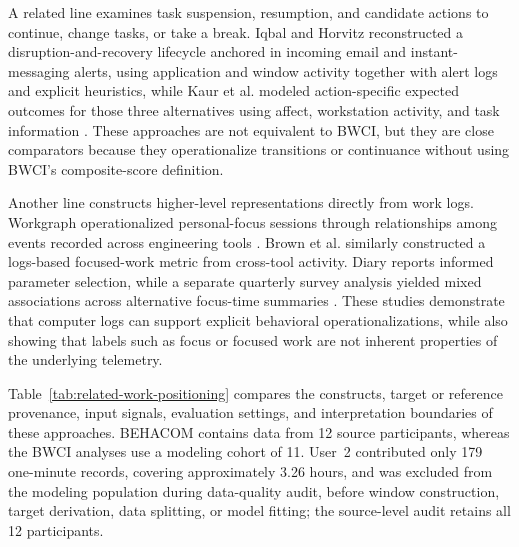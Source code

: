A related line examines task suspension, resumption, and candidate actions to continue, change tasks, or take a break. Iqbal and Horvitz reconstructed a disruption-and-recovery lifecycle anchored in incoming email and instant-messaging alerts, using application and window activity together with alert logs and explicit heuristics, while Kaur et al. modeled action-specific expected outcomes for those three alternatives using affect, workstation activity, and task information \parencite{iqbal2007taskRecovery,kaur2020transitionsBreaks}. These approaches are not equivalent to BWCI, but they are close comparators because they operationalize transitions or continuance without using BWCI's composite-score definition.

Another line constructs higher-level representations directly from work logs. Workgraph operationalized personal-focus sessions through relationships among events recorded across engineering tools \parencite{chen2022workgraph}. Brown et al. similarly constructed a logs-based focused-work metric from cross-tool activity. Diary reports informed parameter selection, while a separate quarterly survey analysis yielded mixed associations across alternative focus-time summaries \parencite{brown2023focusedWork}. These studies demonstrate that computer logs can support explicit behavioral operationalizations, while also showing that labels such as focus or focused work are not inherent properties of the underlying telemetry.

Table~\ref{tab:related-work-positioning} compares the constructs, target or reference provenance, input signals, evaluation settings, and interpretation boundaries of these approaches. BEHACOM contains data from 12 source participants, whereas the BWCI analyses use a modeling cohort of 11. User~2 contributed only 179 one-minute records, covering approximately 3.26 hours, and was excluded from the modeling population during data-quality audit, before window construction, target derivation, data splitting, or model fitting; the source-level audit retains all 12 participants.

